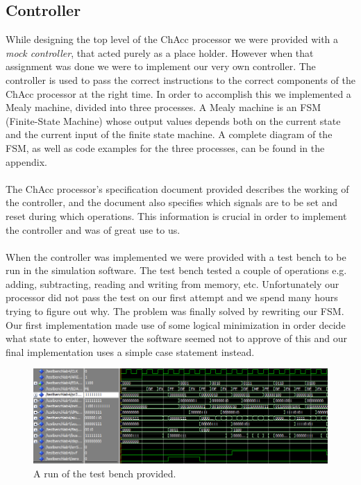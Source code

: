 \documentclass[a4paper,11pt]{article}
\begin{document}
\subsection{Controller}
While designing the top level of the ChAcc processor we were provided with a 
{\it mock controller}, that acted purely as a place holder. However when that 
assignment was done we were to implement our very own controller. The 
controller is used to pass the correct instructions to the correct components 
of the ChAcc processor at the right time. In order to accomplish this we 
implemented a Mealy machine, divided into three processes. A Mealy machine is 
an FSM (Finite-State Machine) whose output values depends both on the current 
state and the current input of the finite state machine. A complete 
diagram of the FSM, as well as code examples for the three processes, can be 
found in the appendix.\\\\
\noindent
The ChAcc processor's specification document provided describes the working 
of the controller, and the document also specifies which signals are to be set 
and reset during which operations. This information is crucial in order to 
implement the controller and was of great use to us.\\\\
\noindent
When the controller was implemented we were provided with a test bench to be 
run in the simulation software. The test bench tested a couple of operations 
e.g. adding, subtracting, reading and writing from memory, etc. Unfortunately 
our processor did not pass the test on our first attempt and we spend many 
hours trying to figure out why. The problem was finally solved by rewriting 
our FSM. Our first implementation made use of some logical minimization in 
order decide what state to enter, however the software seemed not to approve 
of this and our final implementation uses a simple case statement instead.

\begin{figure}[h]
    \centering
    \includegraphics[width=\linewidth]{testbenchlab4.png}
    \caption{A run of the test bench provided.}
    \label{Memory}
\end{figure}
\noindent
\end{document}
